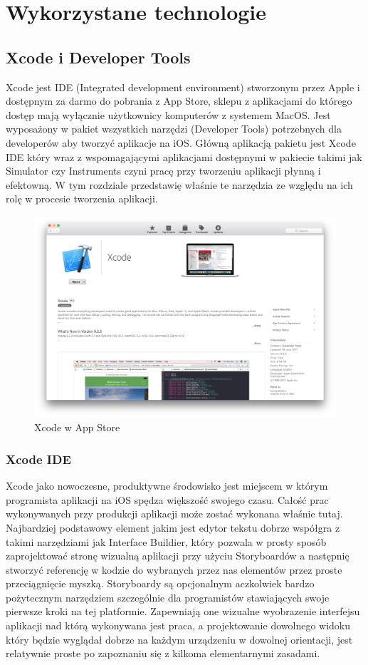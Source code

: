 \chapter{Wykorzystane technologie}

\section{Xcode i Developer Tools}
Xcode jest IDE (Integrated development environment) stworzonym przez Apple i dostępnym za darmo do pobrania z App Store, sklepu z aplikacjami do którego dostęp mają wyłącznie użytkownicy komputerów z systemem MacOS. Jest wyposażony w pakiet wszystkich narzędzi (Developer Tools) potrzebnych dla developerów aby tworzyć aplikacje na iOS. Główną aplikacją pakietu jest Xcode IDE który wraz z wspomagającymi aplikacjami dostępnymi w pakiecie takimi jak Simulator czy Instruments czyni pracę przy tworzeniu aplikacji płynną i efektowną. W tym rozdziale przedstawię właśnie te narzędzia ze względu na ich rolę w procesie tworzenia aplikacji.

\begin{figure}[ht!]
  \centering
  \includegraphics[width=120mm]{images/chapter-2-image-1-appstore.png}
  \caption{Xcode w App Store}
  \label{chapter-2-image-1-appstore}
\end{figure}

\subsection{Xcode IDE}
Xcode jako nowoczesne, produktywne środowisko jest miejscem w którym programista aplikacji na iOS spędza większość swojego czasu. Całość prac wykonywanych przy produkcji aplikacji może zostać wykonana właśnie tutaj. Najbardziej podstawowy element jakim jest edytor tekstu dobrze współgra z takimi narzędziami jak Interface Buildier, który pozwala w prosty sposób zaprojektować stronę wizualną aplikacji przy użyciu Storyboardów a następnię stworzyć referencję w kodzie do wybranych przez nas elementów przez proste przeciągnięcie myszką. Storyboardy są opcjonalnym aczkolwiek bardzo pożytecznym narzędziem szczególnie dla programistów stawiających swoje pierwsze kroki na tej platformie. Zapewniają one wizualne wyobrazenie interfejsu aplikacji nad którą wykonywana jest praca, a projektowanie dowolnego widoku który będzie wyglądał dobrze na każdym urządzeniu w dowolnej orientacji, jest relatywnie proste po zapoznaniu się z kilkoma elementarnymi zasadami.

